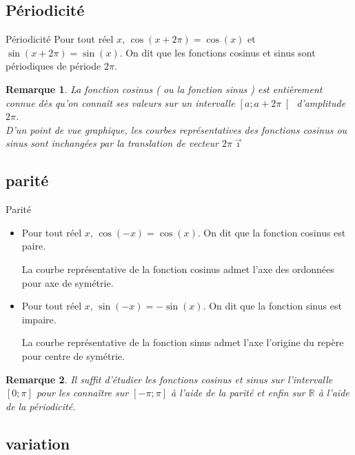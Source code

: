 \documentclass[10pt,a4paper]{article}
\def\R{{\mathbb R}}
\newcommand{\VE}[1]{\overrightarrow{#1}}
\theoremstyle{break}
\newtheorem{Rem}{Remarque}
\begin{document}
	\subsection{Périodicité}
		\begin{bclogo}[couleur = red!25, arrondi = 0.1,logo=\bcbook]{Périodicité}
	Pour tout réel $x$, $\cos \left( x+2\pi \right)= \cos(x)$ et $\sin \left( x+2\pi \right)= \sin(x)$. On dit que les fonctions cosinus et sinus sont périodiques de période $2\pi$.
\end{bclogo}
	\begin{Rem}
			La fonction cosinus ( ou la fonction sinus ) est entièrement connue dès qu'on connaît ses valeurs sur un intervalle $\left[ a ; a+ 2\pi \right[$ d'amplitude $2\pi$.\\
		
		D'un point de vue graphique, les courbes représentatives des fonctions cosinus ou sinus sont inchangées par la translation de vecteur $2\pi \VE{\imath}$
	\end{Rem}

	
	\subsection{parité}
	
	\begin{bclogo}[couleur = red!25, arrondi = 0.1,logo=\bcbook]{Parité}
		\begin{itemize}
			\item Pour tout réel $x$, $\cos (-x)= \cos(x)$. On dit que la fonction cosinus est paire.
			
			La courbe représentative de la fonction cosinus admet l'axe des ordonnées pour axe de symétrie.
			
			\item Pour tout réel $x$, $\sin (-x)= -\sin(x)$. On dit que la fonction sinus est impaire.
			
			La courbe représentative de la fonction sinus admet l'axe l'origine du repère pour centre de symétrie.
		\end{itemize}
	\end{bclogo}
\begin{Rem}
		Il suffit d'étudier les fonctions cosinus et sinus sur l'intervalle $\left[ 0 ; \pi \right]$ pour les connaître sur $\left[ -\pi ; \pi \right]$ à l'aide de la parité et enfin sur $\R$ à l'aide de la périodicité.
\end{Rem}

	
	\subsection{variation}
	
\end{document}
